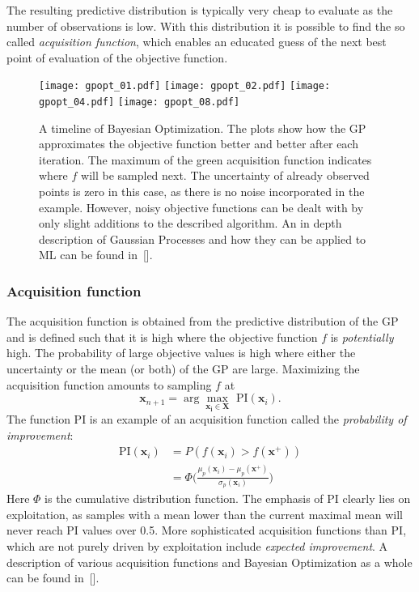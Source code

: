The resulting predictive distribution is typically very cheap to evaluate as
the number of observations is low. With this distribution it is possible
to find the so called \emph{acquisition function}, which enables an educated
guess of the next best point of evaluation of the objective function.

\label{sub:bayesian_optimization}
\begin{figure}
  \centering
  \texttt{[image: gpopt\_01.pdf]}
  \texttt{[image: gpopt\_02.pdf]}
  \texttt{[image: gpopt\_04.pdf]}
  \texttt{[image: gpopt\_08.pdf]}
  \caption{A timeline of Bayesian Optimization. The plots show how the GP
    approximates the objective function better and better after each iteration.
    The maximum of the green acquisition function indicates where $f$ will be
    sampled next.  The uncertainty of already observed points is zero in this
    case, as there is no noise incorporated in the example. However, noisy
    objective functions can be dealt with by only slight additions to the
    described algorithm. An in depth description of Gaussian Processes and
    how they can be applied to ML can be found in~[\cite{rasmussen2004gaussian}].
  }
  \label{fig:gpopt_01}
\end{figure}


\subsubsection{Acquisition function}%
\label{ssub:acquisition_function}

The acquisition function is obtained from the predictive distribution of the 
GP and is defined such that it is high where the objective function $f$ is
\emph{potentially} high.  The probability of large objective values is high
where either the uncertainty or the mean (or both) of the GP are large. 
Maximizing the acquisition function amounts to sampling $f$ at
\begin{equation}
  \mathbf{x}_{n+1} = \arg \max_{\mathbf{x_i} \in \mathbf{X}} 
                     \text{ PI}(\mathbf{x}_i).
\end{equation}
The function PI is an example of an acquisition function called the
\emph{probability of improvement}:
\begin{align}
  \text{PI}(\mathbf{x}_i) &= P(f(\mathbf{x}_i) > f(\mathbf{x}^+)) \\
  &= \Phi\bigg( \frac{\mu_p(\mathbf{x}_i) - \mu_p(\mathbf{x}^+)}
                     {\sigma_p(\mathbf{x}_i)}  \bigg) \nonumber
\end{align}
Here $\Phi$ is the cumulative distribution function. The emphasis of PI clearly
lies on exploitation, as samples with a mean lower than the current maximal
mean will never reach PI values over 0.5.  More sophisticated acquisition
functions than PI, which are not purely driven by exploitation include
\emph{expected improvement}. A description of various acquisition functions
and Bayesian Optimization as a whole can be found in~[\cite{brochu2010bayesopt}].
